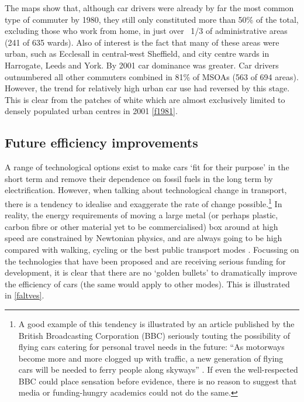 \documentclass[a4paper, 11pt, twoside]{Thesis}
\begin{document}
The maps show that, although car drivers were already by far the most common
type of commuter by 1980, they still only constituted more than 50\% of the
total, excluding those who work from home, in just over ~1/3 of administrative
areas (241 of 635 wards). Also of interest is the fact that many of these areas
were urban, such as Ecclesall in central-west Sheffield, and city centre wards
in Harrogate, Leeds and York. By 2001 car dominance was greater. Car drivers
outnumbered all other commuters combined in 81\% of MSOAs (563 of 694 areas).
However, the trend for relatively high urban car use had reversed by this stage.
This is clear from the patches of white which are almost exclusively limited to
densely populated urban centres in 2001 \cref{f1981}.


\subsection{Future efficiency improvements}
A range of technological options exist to make cars `fit for their purpose'
in the short term \citep{plowden2008cars} and remove their dependence on
fossil fuels in the long term by electrification. However, when talking
about technological change in transport, there is a tendency to
idealise and exaggerate the rate of change possible.\footnote{A
good example of this tendency is illustrated by an article published
by the British Broadcasting Corporation (BBC) seriously
touting the possibility of flying cars catering for personal travel needs in
the future: ``As motorways become more and more clogged up with traffic,
a new generation of flying cars will be needed to ferry people along skyways''
\citep{BBCNews}.
If even the well-respected BBC could place sensation before evidence,
there is no reason to suggest that media or funding-hungry academics
could not do the same.}
In reality, the energy requirements of moving a large metal (or perhaps
plastic, carbon fibre or other material yet to be commercialised)
box around at high speed are constrained by Newtonian
physics, and are always going to be high compared with walking, cycling or
the best public transport modes \citep{MacKay2009}.
Focussing on the technologies that have been proposed and are receiving
serious funding for development, it is clear that there are no `golden
bullets' to dramatically improve the efficiency of cars
(the same would apply to other modes). This is illustrated in \cref{faltves}.
\end{document}
